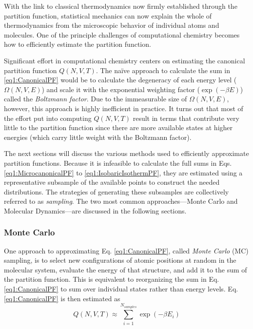 With the link to classical thermodynamics now firmly established through the
partition function, statistical mechanics can now explain the whole of
thermodynamics from the microscopic behavior of individual atoms and molecules.
One of the principle challenges of computational chemistry becomes how to
efficiently estimate the partition function.

Significant effort in computational chemistry centers on estimating the
canonical partition function $Q(N, V, T)$. The na\"ive approach to calculate the
sum in \ref{eq1:CanonicalPF} would be to calculate the degeneracy of each energy
level ($\Omega(N, V, E)$) and scale it with the exponential weighting factor
($\exp(-\beta E)$) called the \emph{Boltzmann factor}. Due to the immeasurable
size of $\Omega(N, V, E)$, however, this approach is highly inefficient in
practice. It turns out that most of the effort put into computing $Q(N, V, T)$
result in terms that contribute very little to the partition function since
there are more available states at higher energies (which carry little weight
with the Boltzmann factor).

The next sections will discuss the various methods used to efficiently
approximate partition functions. Because it is infeasible to calculate the full
sums in Eqs. \ref{eq1:MicrocanonicalPF} to \ref{eq1:IsobaricIsothermPF}, they
are estimated using a representative subsample of the available points to
construct the needed distributions. The strategies of generating these
subsamples are collectively referred to as \emph{sampling}. The two most common
approaches---Monte Carlo and Molecular Dynamics---are discussed in the following
sections.

\subsubsection{Monte Carlo}
\label{sec1:MC}

One approach to approximating Eq. \ref{eq1:CanonicalPF}, called \emph{Monte
Carlo} (MC) sampling, is to select new configurations of atomic positions at
random in the molecular system, evaluate the energy of that structure, and add
it to the sum of the partition function. This is equivalent to reorganizing the
sum in Eq. \ref{eq1:CanonicalPF} to sum over individual states rather than
energy levels. Eq. \ref{eq1:CanonicalPF} is then estimated as
\begin{equation}
   Q(N, V, T) \approx \sum_{i=1}^{N_{samples}} \exp(-\beta E_i)
   \label{eq1:MonteCarloCanonicalPF}
\end{equation}

